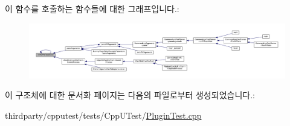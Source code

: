 이 함수를 호출하는 함수들에 대한 그래프입니다.\+:
\nopagebreak
\begin{figure}[H]
\begin{center}
\leavevmode
\includegraphics[width=350pt]{class_test_plugin_aa3524b10b0f1613104fa75f1c1a72cf6_icgraph}
\end{center}
\end{figure}




이 구조체에 대한 문서화 페이지는 다음의 파일로부터 생성되었습니다.\+:\begin{DoxyCompactItemize}
\item 
thirdparty/cpputest/tests/\+Cpp\+U\+Test/\hyperlink{_plugin_test_8cpp}{Plugin\+Test.\+cpp}\end{DoxyCompactItemize}
